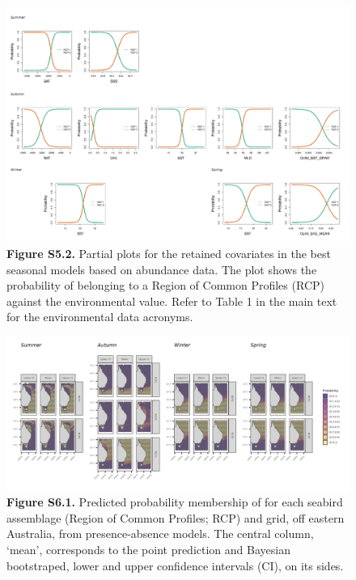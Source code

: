\documentclass[
]{article}
\begin{document}
\begin{landscape}

\begin{figure}
\centering
\includegraphics{../results/FigS6_2_partial-plots-NegBin.png}
\caption{\textbf{Figure S5.2.} Partial plots for the retained covariates
in the best seasonal models based on abundance data. The plot shows the
probability of belonging to a Region of Common Profiles (RCP) against
the environmental value. Refer to Table 1 in the main text for the
environmental data acronyms.}
\end{figure}

\newpage

\begin{figure}
\centering
\includegraphics{../results/FigS5_1_prob-pred-Bernoulli.png}
\caption{\textbf{Figure S6.1.} Predicted probability membership of for
each seabird assemblage (Region of Common Profiles; RCP) and grid, off
eastern Australia, from presence-absence models. The central column,
`mean', corresponds to the point prediction and Bayesian bootstraped,
lower and upper confidence intervals (CI), on its sides.}
\end{figure}


\end{landscape}
\end{document}
